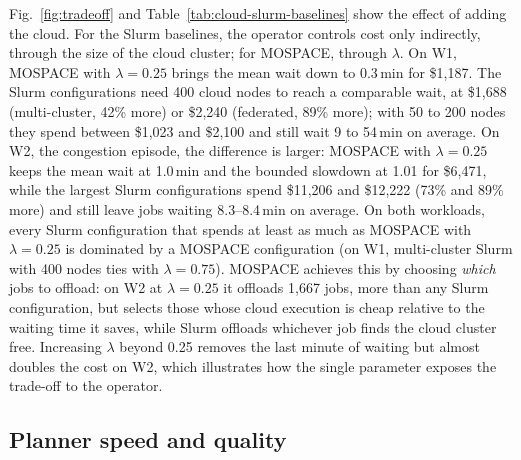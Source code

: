 \documentclass[conference]{IEEEtran}
\begin{document}
Fig.~\ref{fig:tradeoff} and Table~\ref{tab:cloud-slurm-baselines} show the effect of adding the cloud. For the Slurm baselines, the operator controls cost only indirectly, through the size of the cloud cluster; for MOSPACE, through $\lambda$. On W1, MOSPACE with $\lambda=0.25$ brings the mean wait down to 0.3\,min for \$1,187. The Slurm configurations need 400 cloud nodes to reach a comparable wait, at \$1,688 (multi-cluster, 42\% more) or \$2,240 (federated, 89\% more); with 50 to 200 nodes they spend between \$1,023 and \$2,100 and still wait 9 to 54\,min on average. On W2, the congestion episode, the difference is larger: MOSPACE with $\lambda=0.25$ keeps the mean wait at 1.0\,min and the bounded slowdown at 1.01 for \$6,471, while the largest Slurm configurations spend \$11,206 and \$12,222 (73\% and 89\% more) and still leave jobs waiting 8.3--8.4\,min on average. On both workloads, every Slurm configuration that spends at least as much as MOSPACE with $\lambda=0.25$ is dominated by a MOSPACE configuration (on W1, multi-cluster Slurm with 400 nodes ties with $\lambda=0.75$). MOSPACE achieves this by choosing \emph{which} jobs to offload: on W2 at $\lambda=0.25$ it offloads 1,667 jobs, more than any Slurm configuration, but selects those whose cloud execution is cheap relative to the waiting time it saves, while Slurm offloads whichever job finds the cloud cluster free. Increasing $\lambda$ beyond 0.25 removes the last minute of waiting but almost doubles the cost on W2, which illustrates how the single parameter exposes the trade-off to the operator.

\subsection{Planner speed and quality}
\end{document}
